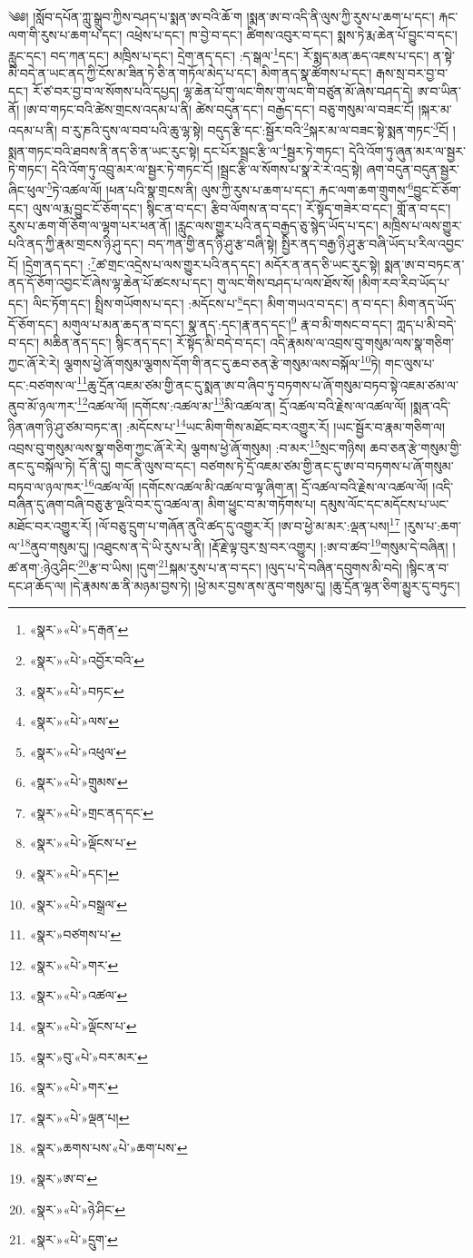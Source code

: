 ༄༅། །སློབ་དཔོན་ཀླུ་སྒྲུབ་ཀྱིས་བཤད་པ་སྨན་ཨ་བའི་ཆོ་ག །སྨན་ཨ་བ་འདི་ནི་ལུས་ཀྱི་རུས་པ་ཆག་པ་དང་། རྐང་ལག་གི་རུས་པ་ཆག་པ་དང་། འཕྲེས་པ་དང་། ཁ་བྱེ་བ་དང་། ཚིགས་འབུར་བ་དང་། སྨས་ཏེ་རྨ་ཆེན་པོ་བྱུང་བ་དང་། རླུང་དང་། བད་ཀན་དང་། མཁྲིས་པ་དང་། དྲེག་ནད་དང་། :ད་སྒལ་\footnote{«སྣར་»«པེ་»ད་རྒན་}དང་། རོ་སྨད་མན་ཆད་འཇས་པ་དང་། ན་སྟེ་མི་བདེ་ན་ཡང་ནད་ཀྱི་ངོས་མ་ཟིན་ཏེ་ཅི་ན་གཏོལ་མེད་པ་དང་། མིག་ནད་སྣ་ཚོགས་པ་དང་། རྒས་སྲ་བར་བྱ་བ་དང་། རོ་ཙ་བར་བྱ་བ་ལ་སོགས་པའི་དཔྱད། ལྷ་ཆེན་པོ་གུ་ལང་གིས་གུ་ལང་གི་བཙུན་མོ་ཞེས་བཤད་དེ། ཨ་བ་ཡིན་ནོ། །ཨ་བ་གཏང་བའི་ཚེས་གྲངས་འདམ་པ་ནི། ཚེས་བདུན་དང་། བརྒྱད་དང་། བཅུ་གསུམ་ལ་བཟང་ངོ། །སྐར་མ་འདམ་པ་ནི། བ་རུ་ཎའི་དུས་ལ་བབ་པའི་ཆུ་ལྷ་སྟེ། བདུད་རྩི་དང་:སྦྱོར་བའི་\footnote{«སྣར་»«པེ་»འབྱོར་བའི་}སྐར་མ་ལ་བཟང་སྟེ་སྨན་གཏང་\footnote{«སྣར་»«པེ་»བཏང་}ངོ། །སྨན་གཏང་བའི་ཐབས་ནི་ནད་ཅི་ན་ཡང་རུང་སྟེ། དང་པོར་སྦྲང་རྩི་ལ་\footnote{«སྣར་»«པེ་»ལས་}སྦྱར་ཏེ་གཏང་། དེའི་འོག་ཏུ་ཞུན་མར་ལ་སྦྱར་ཏེ་གཏང་། དེའི་འོག་ཏུ་འབྲུ་མར་ལ་སྦྱར་ཏེ་གཏང་ངོ། །སྦྲང་རྩི་ལ་སོགས་པ་སྣ་རེ་རེ་འདྲ་སྟེ། ཞག་བདུན་བདུན་སྦྱར་ཞིང་ཕུལ་\footnote{«སྣར་»«པེ་»འཕུལ་}ཏེ་འཚལ་ལོ། །ཕན་པའི་སྣ་གྲངས་ནི། ལུས་ཀྱི་རུས་པ་ཆག་པ་དང་། རྐང་ལག་ཆག་གྲུགས་\footnote{«སྣར་»«པེ་»གྲུམས་}བྱུང་ངོ་ཅོག་དང་། ལུས་ལ་རྨ་བྱུང་ངོ་ཅོག་དང་། སྙིང་ན་བ་དང་། རྩིབ་ལོགས་ན་བ་དང་། རོ་སྟོད་གཟེར་བ་དང་། གློ་ན་བ་དང་། རུས་པ་ཆག་གོ་ཅོག་ལ་ལྷག་པར་ཕན་ནོ། །རླུང་ལས་གྱུར་པའི་ནད་བརྒྱད་ཅུ་སྙེད་ཡོད་པ་དང་། མཁྲིས་པ་ལས་གྱུར་པའི་ནད་ཀྱི་རྣམ་གྲངས་ཉི་ཤུ་དང་། བད་ཀན་གྱི་ནད་ཉི་ཤུ་རྩ་བཞི་སྟེ། སྤྱིར་ནད་བརྒྱ་ཉི་ཤུ་རྩ་བཞི་ཡོད་པ་རིལ་འབྱང་ངོ། །དྲེག་ནད་དང་། :\footnote{«སྣར་»«པེ་»གྲང་ནད་དང་}ཚ་གྲང་འདྲེས་པ་ལས་གྱུར་པའི་ནད་དང་། མདོར་ན་ནད་ཅི་ཡང་རུང་སྟེ། སྨན་ཨ་བ་བཏང་ན་ནད་དོ་ཅོག་འབྱང་ངོ་ཞེས་ལྷ་ཆེན་པོ་ཚངས་པ་དང་། གུ་ལང་གིས་བཤད་པ་ལས་ཐོས་སོ། །མིག་རབ་རིབ་ཡོད་པ་དང་། ལིང་ཏོག་དང་། སྤྲིས་གཡོགས་པ་དང་། :མདོངས་པ་\footnote{«སྣར་»«པེ་»ལྡོངས་པ་}དང་། མིག་གཡའ་བ་དང་། ན་བ་དང་། མིག་ནད་ཡོད་དོ་ཅོག་དང་། མགུལ་པ་མན་ཆད་ན་བ་དང་། སྣ་ནད་:དང་།རྣ་ནད་དང་།\footnote{«སྣར་»«པེ་»དང་།} རྣ་བ་མི་གསང་བ་དང་། ཀླད་པ་མི་བདེ་བ་དང་། མཆིན་ནད་དང་། སྙིང་ནད་དང་། རོ་སྟོད་མི་བདེ་བ་དང་། འདི་རྣམས་ལ་འབྲས་བུ་གསུམ་ལས་སྣ་གཅིག་ཀྱང་ཞོ་རེ་རེ། ལྕགས་ཕྱེ་ཞོ་གསུམ་ལྕགས་དོག་གི་ནང་དུ་ཆབ་ཅན་རྩེ་གསུམ་ལས་བསྐོལ་\footnote{«སྣར་»«པེ་»བསྒྲལ་}ཏེ། གང་ལུས་པ་དང་:བཙགས་ལ་\footnote{«སྣར་»བཙགས་པ་}ཆུ་དྲོན་འཇམ་ཙམ་གྱི་ནང་དུ་སྨན་ཨ་བ་ཞིབ་ཏུ་བཏགས་པ་ཞོ་གསུམ་བཏབ་སྟེ་འཇམ་ཙམ་ལ་ནུབ་མོ་ཉལ་ཀར་\footnote{«སྣར་»«པེ་»གར་}འཚལ་ལོ། །དགོངས་:འཚལ་མ་\footnote{«སྣར་»«པེ་»འཚལ་}མི་འཚལ་ན། དྲོ་འཚལ་བའི་རྗེས་ལ་འཚལ་ལོ། །སྨན་འདི་ཉིན་ཞག་ཉི་ཤུ་ཙམ་བཏང་ན། :མདོངས་པ་\footnote{«སྣར་»«པེ་»ལྡོངས་པ་}ཡང་མིག་གིས་མཐོང་བར་འགྱུར་རོ། །ཡང་སྦྱོར་བ་རྣམ་གཅིག་ལ། འབྲས་བུ་གསུམ་ལས་སྣ་གཅིག་ཀྱང་ཞོ་རེ་རེ། ལྕགས་ཕྱེ་ཞོ་གསུམ། :བ་མར་\footnote{«སྣར་»བུ་«པེ་»བར་མར་}སྲང་གཉིས། ཆབ་ཅན་རྩེ་གསུམ་གྱི་ནང་དུ་བསྐོལ་ཏེ། དོ་ནི་དུ། གང་ནི་ལུས་བ་དང་། བཙགས་ཏེ་དྲོ་འཇམ་ཙམ་གྱི་ནང་དུ་ཨ་བ་བཏགས་པ་ཞོ་གསུམ་བཏབ་ལ་ཉལ་ཁར་\footnote{«སྣར་»«པེ་»གར་}འཚལ་ལོ། །དགོངས་འཚལ་མི་འཚལ་བ་ལྟ་ཞིག་ན། དྲོ་འཚལ་བའི་རྗེས་ལ་འཚལ་ལོ། །འདི་བཞིན་དུ་ཞག་བཞི་བཅུ་རྩ་ལྔའི་བར་དུ་འཚལ་ན། མིག་ཕྱུང་བ་མ་གཏོགས་པ། དམུས་ལོང་དང་མདོངས་པ་ཡང་མཐོང་བར་འགྱུར་རོ། །ལོ་བཅུ་དྲུག་པ་གཞོན་ནུའི་ཚད་དུ་འགྱུར་རོ། །ཨ་བ་ཕྱེ་མ་མར་:ལྡན་པས།\footnote{«སྣར་»«པེ་»ལྡན་པ།} །རུས་པ་:ཆག་ལ་\footnote{«སྣར་»ཆགས་པས་«པེ་»ཆག་པས་}ནུབ་གསུམ་དུ། །འཐུངས་ན་དེ་ཡི་རུས་པ་ནི། །རྡོ་རྗེ་ལྟ་བུར་སྲ་བར་འགྱུར། །:ཨ་བ་ཚབ་\footnote{«སྣར་»ཨ་བ་}གསུམ་དེ་བཞིན། །ཚ་ནག་:ཉེའུ་ཤིང་\footnote{«སྣར་»«པེ་»ཉེ་ཤིང་}རྩ་བ་ཡིས། །དུག་\footnote{«སྣར་»«པེ་»དྲུག་}སྐམ་རུས་པ་ན་བ་དང་། །ལུད་པ་དེ་བཞིན་དབུགས་མི་བདེ། །སྙིང་ན་བ་དང་ཤ་ཆོད་ལ། །དེ་རྣམས་ཆ་ནི་མཉམ་བྱས་ཏེ། །ཕྱེ་མར་བྱས་ནས་ནུབ་གསུམ་དུ། །ཆུ་དྲོན་ལྷན་ཅིག་མྱུར་དུ་བཏུང་། 